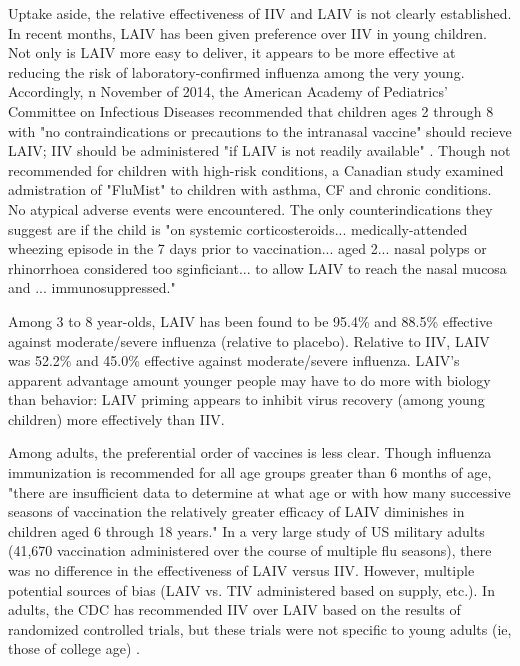 \documentclass[11pt]{article}
\begin{document}
\begin{multicols}{2}
Uptake aside, the relative effectiveness of IIV and LAIV is not clearly established.  In recent months, LAIV has been given preference over IIV in young children.  Not only is LAIV more easy to deliver, it appears to be more effective at reducing the risk of laboratory-confirmed influenza among the very young.  Accordingly, n November of 2014, the American Academy of Pediatrics' Committee on Infectious Diseases recommended that children ages 2 through 8 with "no contraindications or precautions to the intranasal vaccine" should recieve LAIV; IIV should be administered "if LAIV is not readily available" \cite{peds2014}.  Though not recommended for children with high-risk conditions, a Canadian study examined admistration of "FluMist" to children with asthma, CF and chronic conditions.  No atypical adverse events were encountered.  The only counterindications they suggest are if the child is "on systemic corticosteroids... medically-attended wheezing episode in the 7 days prior to vaccination... aged 2... nasal polyps or rhinorrhoea considered too sginficiant... to allow LAIV to reach the nasal mucosa and ... immunosuppressed." \cite{Quach2014} 

Among 3 to 8 year-olds, LAIV has been found to be 95.4\% and 88.5\% effective against moderate/severe influenza (relative to placebo).  Relative to IIV, LAIV was 52.2\% and 45.0\% effective against moderate/severe influenza. \cite{Ambrose2014} LAIV's apparent advantage amount younger people may have to do more with biology than behavior: LAIV priming appears to inhibit virus recovery (among young children) more effectively than IIV. \cite{Ilyushina2014}

Among adults, the preferential order of vaccines is less clear.  Though influenza immunization is recommended for all age groups greater than 6 months of age, "there are insufficient data to determine at what age or with how many successive seasons of vaccination the relatively greater efficacy of LAIV diminishes in children aged 6 through 18 years." \cite{cdcrec2014}  In a very large study of US military adults (41,670 vaccination administered over the course of multiple flu seasons), there was no difference in the effectiveness of LAIV versus IIV. However, multiple potential sources of bias (LAIV vs. TIV administered based on supply, etc.). \cite{Phillips2012} In adults, the CDC has recommended IIV over LAIV based on the results of randomized controlled trials, but these trials were not specific to young adults (ie, those of college age) \cite{Forrest2011, Ohmit2008}.


\end{multicols}
\end{document}
